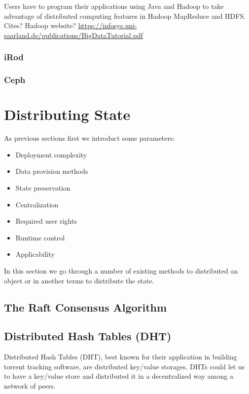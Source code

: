 Users have to program their applications using Java and Hadoop to 
take advantage of distributed computing features in Hadoop MapReduce
and HDFS. Cites? Hadoop website?
\url{https://infosys.uni-saarland.de/publications/BigDataTutorial.pdf}

\subsubsection{iRod}
\subsubsection{Ceph}

\section{Distributing State}
As previous sections first we introduct some parameters:
\begin{itemize}
\item Deployment complexity
\item Data provision methods
\item State preservation
\item Centralization
\item Required user rights
\item Runtime control
\item Applicability
\end{itemize}
In this section we go through a number of existing methods to distributed an object or in another terms to distribute the state.

\subsection{The Raft Consensus Algorithm}\cite{ongaro2014search}

\subsection{Distributed Hash Tables (DHT)}
Distributed Hash Tables (DHT), best known for their application in building torrent tracking software,
are distributed key/value storages. DHTs could let us to have a key/value store and distributed it in 
a decentralized way among a network of peers.

